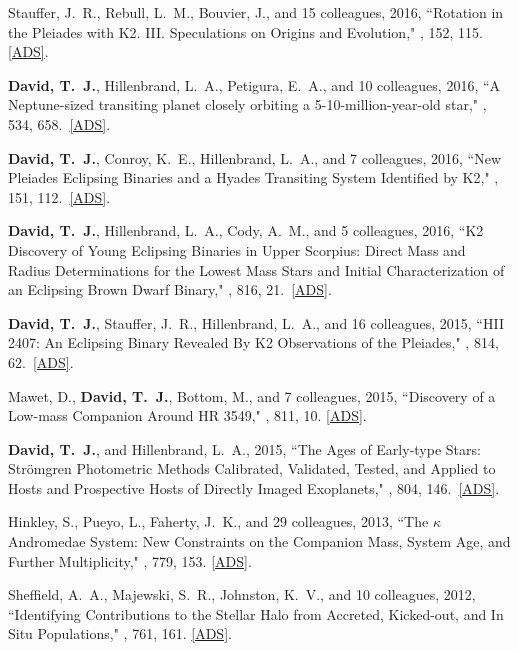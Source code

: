 \item {Stauffer}, J.~R., {Rebull}, L.~M., {Bouvier}, J., and 15 colleagues, 2016, ``{Rotation in the Pleiades with K2. III. Speculations on Origins and Evolution}," \aj, 152, 115. \href{https://ui.adsabs.harvard.edu/#abs/2016AJ....152..115S}{[ADS]}. 

\item {\bf {\bf David, T.}~J.}, {Hillenbrand}, L.~A., {Petigura}, E.~A., and 10 colleagues, 2016, ``{A Neptune-sized transiting planet closely orbiting a 5-10-million-year-old star}," \nature, 534, 658.\ \href{https://ui.adsabs.harvard.edu/#abs/2016Natur.534..658D/}{[ADS]}. 

\item {\bf {\bf David, T.}~J.}, {Conroy}, K.~E., {Hillenbrand}, L.~A., and 7 colleagues, 2016, ``{New Pleiades Eclipsing Binaries and a Hyades Transiting System Identified by K2}," \aj, 151, 112.\ \href{https://ui.adsabs.harvard.edu/#abs/2016AJ....151..112D/}{[ADS]}.

\item {\bf {\bf David, T.}~J.}, {Hillenbrand}, L.~A., {Cody}, A.~M., and 5 colleagues, 2016, ``{K2 Discovery of Young Eclipsing Binaries in Upper Scorpius: Direct Mass and Radius Determinations for the Lowest Mass Stars and Initial Characterization of an Eclipsing Brown Dwarf Binary}," \apj, 816, 21.\ \href{https://ui.adsabs.harvard.edu/#abs/2016ApJ...816...21D/}{[ADS]}.

\item {\bf {\bf David, T.}~J.}, {Stauffer}, J.~R., {Hillenbrand}, L.~A., and 16 colleagues, 2015, ``{HII 2407: An Eclipsing Binary Revealed By K2 Observations of the Pleiades}," \apj, 814, 62.\ \href{https://ui.adsabs.harvard.edu/#abs/2015ApJ...814...62D/}{[ADS]}.

\item {Mawet}, D., {\bf {David}, T.~J.}, {Bottom}, M., and 7 colleagues, 2015, ``{Discovery of a Low-mass Companion Around HR 3549}," \apj, 811, 10. \href{https://ui.adsabs.harvard.edu/#abs/2015ApJ...811..103M}{[ADS]}.

\item {\bf {\bf David, T.}~J.}, and {Hillenbrand}, L.~A., 2015, ``{The Ages of Early-type Stars: Str{\"o}mgren Photometric Methods Calibrated, Validated, Tested, and Applied to Hosts and Prospective Hosts of Directly Imaged Exoplanets}," \apj, 804, 146.\ \href{https://ui.adsabs.harvard.edu/#abs/2015ApJ...804..146D/}{[ADS]}.

\item {Hinkley}, S., {Pueyo}, L., {Faherty}, J.~K., and 29 colleagues, 2013, ``{The {\ensuremath{\kappa}} Andromedae System: New Constraints on the Companion Mass, System Age, and Further Multiplicity}," \apj, 779, 153. \href{https://ui.adsabs.harvard.edu/#abs/2013ApJ...779..153H}{[ADS]}.

\item {Sheffield}, A.~A., {Majewski}, S.~R., {Johnston}, K.~V., and 10 colleagues, 2012, ``{Identifying Contributions to the Stellar Halo from Accreted, Kicked-out, and In Situ Populations}," \apj, 761, 161. \href{https://ui.adsabs.harvard.edu/#abs/2012ApJ...761..161S}{[ADS]}. 